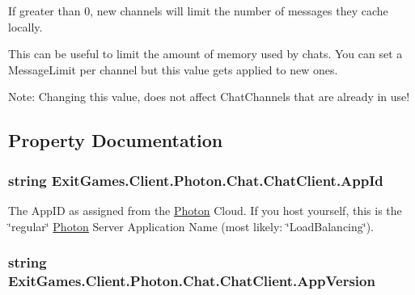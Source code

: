 If greater than 0, new channels will limit the number of messages they cache locally. 

This can be useful to limit the amount of memory used by chats. You can set a Message\+Limit per channel but this value gets applied to new ones.

Note\+: Changing this value, does not affect Chat\+Channels that are already in use! 

\subsection{Property Documentation}
\subsubsection[{\texorpdfstring{App\+Id}{AppId}}]{\setlength{\rightskip}{0pt plus 5cm}string Exit\+Games.\+Client.\+Photon.\+Chat.\+Chat\+Client.\+App\+Id\hspace{0.3cm}{\ttfamily [get]}}\hypertarget{class_exit_games_1_1_client_1_1_photon_1_1_chat_1_1_chat_client_a876c9a53400fe18fc365775ca728928f}{}\label{class_exit_games_1_1_client_1_1_photon_1_1_chat_1_1_chat_client_a876c9a53400fe18fc365775ca728928f}


The App\+ID as assigned from the \hyperlink{namespace_exit_games_1_1_client_1_1_photon}{Photon} Cloud. If you host yourself, this is the \char`\"{}regular\char`\"{} \hyperlink{namespace_exit_games_1_1_client_1_1_photon}{Photon} Server Application Name (most likely\+: \char`\"{}\+Load\+Balancing\char`\"{}).

\subsubsection[{\texorpdfstring{App\+Version}{AppVersion}}]{\setlength{\rightskip}{0pt plus 5cm}string Exit\+Games.\+Client.\+Photon.\+Chat.\+Chat\+Client.\+App\+Version\hspace{0.3cm}{\ttfamily [get]}}\hypertarget{class_exit_games_1_1_client_1_1_photon_1_1_chat_1_1_chat_client_a96bec51384215e8622397b8fe2fc90e1}{}\label{class_exit_games_1_1_client_1_1_photon_1_1_chat_1_1_chat_client_a96bec51384215e8622397b8fe2fc90e1}



